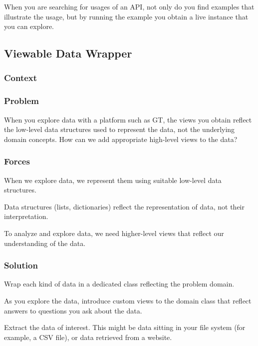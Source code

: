 \documentclass[sigconf]{acmart}
\begin{document}
When you are searching for usages of an API, not only do you find examples that illustrate the usage, but by running the example you obtain a live instance that you can explore.

\subsection*{Viewable Data Wrapper}\label{pat:viewableDataWrapper}
\subsubsection*{Context}
\subsubsection*{Problem}

When you explore data with a platform such as GT, the views you obtain reflect the low-level data structures used to represent the data, not the underlying domain concepts. How can we add appropriate high-level views to the data?

\subsubsection*{Forces}

When we explore data, we represent them using suitable low-level data structures.

Data structures (lists, dictionaries) reflect the representation of data, not their interpretation.

To analyze and explore data, we need higher-level views that reflect our understanding of the data.

\subsubsection*{Solution}

Wrap each kind of data in a dedicated class reflecting the problem domain. 

As you explore the data, introduce custom views to the domain class that reflect answers to questions you ask about the data.

Extract the data of interest. This might be data sitting in your file system (for example, a CSV file), or data retrieved from a website.
\end{document}
